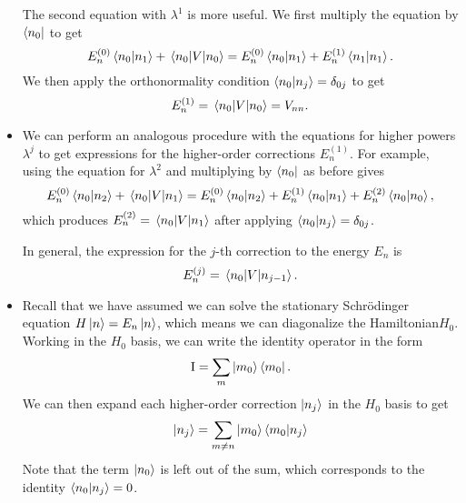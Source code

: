 \documentclass[11pt, a4paper]{article}
\newcommand{\Schro}{Schr\"{o}dinger\xspace}
\newcommand{\Ham}{Hamiltonian\xspace}
\newcommand{\II}{\operatorname{I}}  %
\begin{document}
\begin{itemize}
    The second equation with $ \lambda^{1} $ is more useful. We first multiply the equation by $ \bra{n_{0}} $ to get
    \begin{equation*}
        E_{n}^{(0)} \braket{n_{0}}{n_{1}} + \mel{n_{0}}{V}{n_{0}} = E_{n}^{(0)}\braket{n_{0}}{n_{1}} + E_{n}^{(1)}\braket{n_{1}}{n_{1}}.
    \end{equation*}
     We then apply the orthonormality condition $ \braket{n_{0}}{n_{j}} = \delta_{0j} $ to get 
     \begin{equation*}
         E_{n}^{(1)} = \mel{n_{0}}{V}{n_{0}} = V_{nn}.
     \end{equation*}

     \item We can perform an analogous procedure with the equations for higher powers $ \lambda^{j} $ to get expressions for the higher-order corrections $ E_{n}^{(1)} $. For example, using the equation for $ \lambda^{2} $ and multiplying by $ \bra{n_{0}} $ as before gives
    \begin{equation*}
        E_{n}^{(0)} \braket{n_{0}}{n_{2}} + \mel{n_{0}}{V}{n_{1}} = E_{n}^{(0)}\braket{n_{0}}{n_{2}} + E_{n}^{(1)}\braket{n_{0}}{n_{1}} + E_{n}^{(2)}\braket{n_{0}}{n_{0}}, 
    \end{equation*}
    which produces $ E_{n}^{(2)} = \mel{n_{0}}{V}{n_{1}}$ after applying $ \braket{n_{0}}{n_{j}} = \delta_{0j} $. 

    In general, the expression for the $ j $-th correction to the energy $ E_{n} $ is
    \begin{equation*}
        E_{n}^{(j)} = \mel{n_{0}}{V}{n_{j-1}}.
    \end{equation*}
    
    \item Recall that we have assumed we can solve the stationary \Schro equation $ H \ket{n} = E_{n} \ket{n} $, which means we can diagonalize the \Ham $ H_{0} $. Working in the $ H_{0} $ basis, we can write the identity operator in the form
    \begin{equation*}
        \II = \sum_{m}\ket{m_{0}}\bra{m_{0}}.
    \end{equation*}
    We can then expand each higher-order correction $ \ket{n_{j}} $ in the $ H_{0} $ basis to get
    \begin{equation*}
        \ket{n_{j}} = \sum_{m \neq n}\ket{m_{0}}\braket{m_{0}}{n_{j}}
    \end{equation*}
    Note that the term $ \ket{n_{0}} $ is left out of the sum, which corresponds to the identity $ \braket{n_{0}}{n_{j}} = 0 $. 


\end{itemize}
\end{document}
